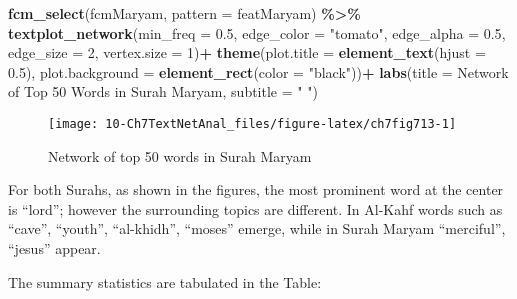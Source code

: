 \documentclass[
]{article}
\newenvironment{Shaded}{\begin{snugshade}}{\end{snugshade}}
\newcommand{\AttributeTok}[1]{\textcolor[rgb]{0.13,0.29,0.53}{#1}}
\newcommand{\DecValTok}[1]{\textcolor[rgb]{0.00,0.00,0.81}{#1}}
\newcommand{\FloatTok}[1]{\textcolor[rgb]{0.00,0.00,0.81}{#1}}
\newcommand{\FunctionTok}[1]{\textcolor[rgb]{0.13,0.29,0.53}{\textbf{#1}}}
\newcommand{\NormalTok}[1]{#1}
\newcommand{\SpecialCharTok}[1]{\textcolor[rgb]{0.81,0.36,0.00}{\textbf{#1}}}
\newcommand{\StringTok}[1]{\textcolor[rgb]{0.31,0.60,0.02}{#1}}
\begin{document}
\begin{Shaded}
\begin{Highlighting}[]
\FunctionTok{fcm\_select}\NormalTok{(fcmMaryam, }\AttributeTok{pattern =}\NormalTok{ featMaryam) }\SpecialCharTok{\%\textgreater{}\%}
    \FunctionTok{textplot\_network}\NormalTok{(}\AttributeTok{min\_freq =} \FloatTok{0.5}\NormalTok{, }
                     \AttributeTok{edge\_color =} \StringTok{"tomato"}\NormalTok{, }
                     \AttributeTok{edge\_alpha =} \FloatTok{0.5}\NormalTok{, }
                     \AttributeTok{edge\_size =} \DecValTok{2}\NormalTok{,}
                     \AttributeTok{vertex.size =} \DecValTok{1}\NormalTok{)}\SpecialCharTok{+}
  \FunctionTok{theme}\NormalTok{(}\AttributeTok{plot.title =} \FunctionTok{element\_text}\NormalTok{(}\AttributeTok{hjust =} \FloatTok{0.5}\NormalTok{),}
        \AttributeTok{plot.background =} \FunctionTok{element\_rect}\NormalTok{(}\AttributeTok{color =} \StringTok{"black"}\NormalTok{))}\SpecialCharTok{+}
  \FunctionTok{labs}\NormalTok{(}\AttributeTok{title =} \StringTok{\textquotesingle{}Network of Top 50 Words in Surah Maryam\textquotesingle{}}\NormalTok{,}
       \AttributeTok{subtitle =} \StringTok{" "}\NormalTok{) }
\end{Highlighting}
\end{Shaded}

\begin{figure}

{\centering \texttt{[image: 10-Ch7TextNetAnal\_files/figure-latex/ch7fig713-1]} 

}

\caption{Network of top 50 words in Surah Maryam}\label{fig:ch7fig713}
\end{figure}

For both Surahs, as shown in the figures, the most prominent word at the center is ``lord''; however the surrounding topics are different. In Al-Kahf words such as ``cave'', ``youth'', ``al-khidh'', ``moses'' emerge, while in Surah Maryam ``merciful'', ``jesus'' appear.

The summary statistics are tabulated in the Table:
\end{document}
